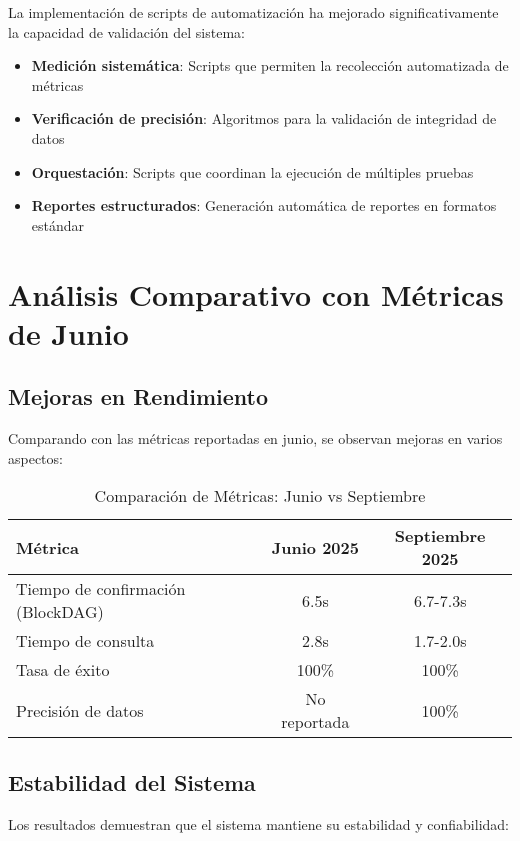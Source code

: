\documentclass[onecolumn]{article}
\begin{document}
La implementación de scripts de automatización ha mejorado significativamente la capacidad de validación del sistema:

\begin{itemize}
    \item \textbf{Medición sistemática}: Scripts que permiten la recolección automatizada de métricas
    \item \textbf{Verificación de precisión}: Algoritmos para la validación de integridad de datos
    \item \textbf{Orquestación}: Scripts que coordinan la ejecución de múltiples pruebas
    \item \textbf{Reportes estructurados}: Generación automática de reportes en formatos estándar
\end{itemize}

\section{Análisis Comparativo con Métricas de Junio}

\subsection{Mejoras en Rendimiento}

Comparando con las métricas reportadas en junio, se observan mejoras en varios aspectos:

\begin{table}[H]
\centering
\caption{Comparación de Métricas: Junio vs Septiembre}
\begin{tabular}{@{}lcc@{}}
\toprule
\textbf{Métrica} & \textbf{Junio 2025} & \textbf{Septiembre 2025} \\
\midrule
Tiempo de confirmación (BlockDAG) & 6.5s & 6.7-7.3s \\
Tiempo de consulta & 2.8s & 1.7-2.0s \\
Tasa de éxito & 100\% & 100\% \\
Precisión de datos & No reportada & 100\% \\
\bottomrule
\end{tabular}
\end{table}

\subsection{Estabilidad del Sistema}

Los resultados demuestran que el sistema mantiene su estabilidad y confiabilidad:
\end{document}
